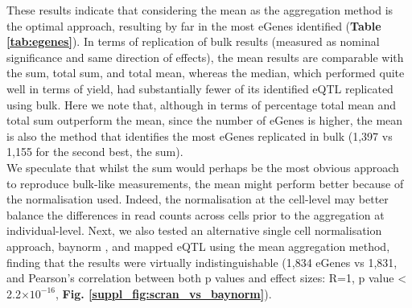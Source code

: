 
These results indicate that considering the mean as the aggregation method is the optimal approach, resulting by far in the most eGenes identified (\textbf{Table \ref{tab:egenes}}).
In terms of replication of bulk results (measured as nominal significance and same direction of effects), the mean results are comparable with the sum, total sum, and total mean, whereas the median, which performed quite well in terms of yield, had substantially fewer of its identified eQTL replicated using bulk. 
Here we note that, although in terms of percentage total mean and total sum outperform the mean, since the number of eGenes is higher, the mean is also the method that identifies the most eGenes replicated in bulk (1,397 vs 1,155 for the second best, the sum). \\

We speculate that whilst the sum would perhaps be the most obvious approach to reproduce bulk-like measurements, the mean might perform better because of the normalisation used.
Indeed, the normalisation at the cell-level may better balance the differences in read counts across cells prior to the aggregation at individual-level. 
Next, we also tested an alternative single cell normalisation approach, baynorm \cite{tang2020baynorm}, and mapped eQTL using the mean aggregation method, finding that the results were virtually indistinguishable (1,834 eGenes vs 1,831, and Pearson's correlation between both p values and effect sizes: R=1, p value < 2.2$\times 10^{-16}$, \textbf{Fig. \ref{suppl_fig:scran_vs_baynorm}}). \\

